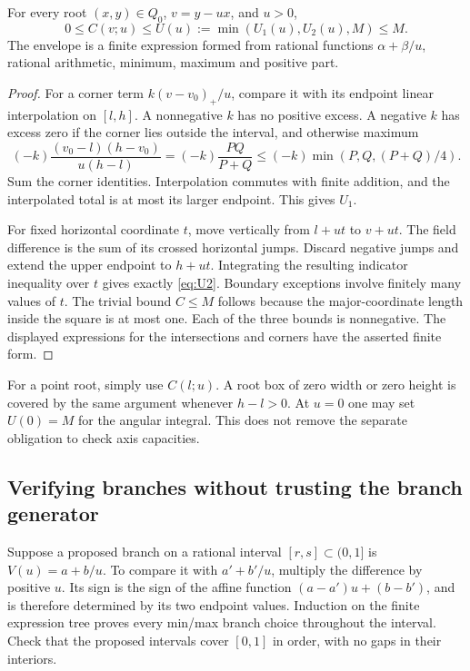 \begin{proposition}\label{prop:envelope}
For every root \((x,y)\in Q_0\), \(v=y-ux\), and \(u>0\),
\begin{equation}\label{eq:envelope}
 0\le C(v;u)\le U(u):=\min(U_1(u),U_2(u),M)\le M.
\end{equation}
The envelope is a finite expression formed from rational functions
\(\alpha+\beta/u\), rational arithmetic, minimum, maximum and
positive part.
\end{proposition}
\begin{proof}
For a corner term \(k(v-v_0)_+/u\), compare it with its endpoint
linear interpolation on \([l,h]\). A nonnegative \(k\) has no
positive excess. A negative \(k\) has excess zero if the corner
lies outside the interval, and otherwise maximum
\[
 (-k)\frac{(v_0-l)(h-v_0)}{u(h-l)}
 =(-k)\frac{PQ}{P+Q}
 \le(-k)\min(P,Q,(P+Q)/4).
\]
Sum the corner identities. Interpolation commutes with finite
addition, and the interpolated total is at most its larger endpoint.
This gives \(U_1\).

For fixed horizontal coordinate \(t\), move vertically from
\(l+ut\) to \(v+ut\). The field difference is the sum of its
crossed horizontal jumps. Discard negative jumps and extend the
upper endpoint to \(h+ut\). Integrating the resulting indicator
inequality over \(t\) gives exactly \eqref{eq:U2}. Boundary
exceptions involve finitely many values of \(t\). The trivial
bound \(C\le M\) follows because the major-coordinate length
inside the square is at most one. Each of the three bounds is
nonnegative. The displayed expressions for the intersections and
corners have the asserted finite form.
\end{proof}

For a point root, simply use \(C(l;u)\). A root box of zero width
or zero height is covered by the same argument whenever \(h-l>0\).
At \(u=0\) one may set \(U(0)=M\) for the angular integral.
This does not remove the separate obligation to check axis capacities.

\subsection{Verifying branches without trusting the branch generator}
Suppose a proposed branch on a rational interval \([r,s]\subset(0,1]\)
is \(V(u)=a+b/u\). To compare it with
\(a'+b'/u\), multiply the difference by positive \(u\).
Its sign is the sign of the affine function
\((a-a')u+(b-b')\), and is therefore determined by its two endpoint
values. Induction on the finite expression tree proves every min/max
branch choice throughout the interval. Check that the proposed
intervals cover \([0,1]\) in order, with no gaps in their interiors.


